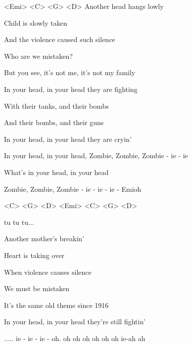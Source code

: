 


<Emi> <C> <G> <D>
\zs
Another head hangs lowly

Child is slowly taken
 
And the violence caused such silence
 
Who are we mistaken?
 
But you see, it's not me, it's not my family

In your head, in your head they are fighting
\ks

\zr 
With their tanks, and their bombs

And their bombs, and their guns

In your head, in your head they are cryin'
 
In your head, in your head, Zombie, Zombie, Zombie - ie - ie

What's in your head, in your head

Zombie, Zombie, Zombie - ie - ie - ie - Emioh

<C> <G> <D> <Emi> <C> <G> <D> 

tu tu tu...
\kr

\zs
Another mother's breakin' 

Heart is taking over

When violence causes silence 

We must be mistaken

It's the same old theme since 1916

In your head, in your head they're still fightin'
\ks

\zr
..... ie - ie - ie - oh. oh oh oh oh oh oh ie-ah ah 
\kr 

\kp
